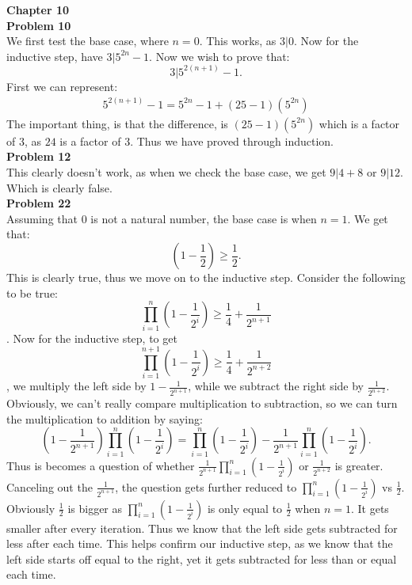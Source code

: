 \documentclass[12pt]{article}
\begin{document}
\noindent
\textbf{Chapter 10}\\

\noindent
\textbf{Problem 10}\\
We first test the base case, where $n = 0$. This works, as $3|0$. Now for the inductive
step, have  $3|5^{2n}-1$. Now we wish to prove that: 
\[
	3|5^{2(n+1)}-1
.\] 
First we can represent:
\begin{align}
	5^{2(n+1)}-1 = 5^{2n}-1 + (25-1)(5^{2n})
\end{align}
 The important thing, is that the difference, is $(25-1)(5^{2n})$ which is a factor
 of $3$, as $24$ is a factor of $3$. Thus we have proved through induction. \\
 
\noindent
\textbf{Problem 12}\\
This clearly doesn't work, as when we check the base case, we get $9|4+8$ or
$9|12$. Which is clearly false.  \\

\noindent
\textbf{Problem 22} \\
Assuming that $0$ is not a natural number, the base case is when $n = 1$.
We get that: 
 \[
	 (1-\frac{1}{2}) \ge \frac{1}{2}
.\] 
This is clearly true, thus we move on to the inductive step. Consider the following to be true:
\[
	\prod^{n}_{i=1}(1-\frac{1}{2^i}) \ge \frac{1}{4} + \frac{1}{2^{n+1}} 
\].
Now for the inductive step, to get 
\[
	\prod^{n+1}_{i=1}(1-\frac{1}{2^i}) \ge \frac{1}{4} + \frac{1}{2^{n+2}} 
\]
, we multiply the left side by $1-\frac{1}{2^{n+1}}$, while we 
subtract the right side by $\frac{1}{2^{n+2}}$. Obviously, we can't really compare
multiplication to subtraction, so we can turn the multiplication to addition by saying:
\[
	(1-\frac{1}{2^{n+1}})\prod^{n}_{i=1}(1-\frac{1}{2^i}) =
	\prod^{n}_{i=1}(1-\frac{1}{2^i}) - \frac{1}{2^{n+1}}\prod^{n}_{i=1}(1-\frac{1}{2^i}) 
.\]
Thus is becomes a question of whether $\frac{1}{2^{n+1}}\prod^{n}_{i=1}(1-\frac{1}{2^i})$
or $\frac{1}{2^{n+2}}$ is greater. Canceling out the $\frac{1}{2^{n+1}}$, the question gets 
further reduced to $\prod^{n}_{i=1}(1-\frac{1}{2^i})$ vs $\frac{1}{2}$. Obviously $\frac{1}{2}$
is bigger as $\prod^{n}_{i=1}(1-\frac{1}{2^i})$ is only equal to $\frac{1}{2}$
when $n = 1$. It gets smaller after every iteration. Thus we know that the left side gets subtracted
for less after each time. This helps confirm our inductive step, as we know that the left side starts off 
equal to the right, yet it gets subtracted for less than or equal each time. \\
\end{document}
